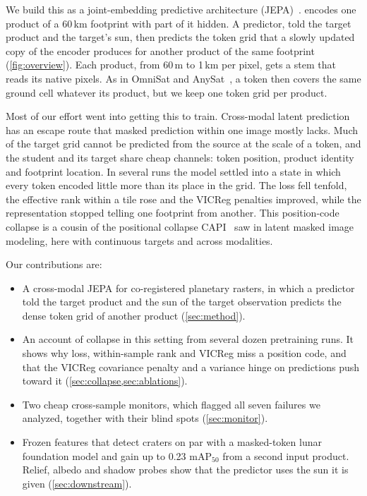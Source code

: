 We build this as a joint-embedding predictive architecture (JEPA)~\cite{assran2023self,bardes2024revisiting}. \method encodes one product of a 60\,km footprint with part of it hidden. A predictor, told the target product and the target's sun, then predicts the token grid that a slowly updated copy of the encoder produces for another product of the same footprint (\cref{fig:overview}). Each product, from 60\,m to 1\,km per pixel, gets a stem that reads its native pixels. As in OmniSat and AnySat~\cite{astruc2024omnisat,astruc2025anysat}, a token then covers the same ground cell whatever its product, but we keep one token grid per product.

Most of our effort went into getting this to train. Cross-modal latent prediction has an escape route that masked prediction within one image mostly lacks. Much of the target grid cannot be predicted from the source at the scale of a token, and the student and its target share cheap channels: token position, product identity and footprint location. In several runs the model settled into a state in which every token encoded little more than its place in the grid. The loss fell tenfold, the effective rank within a tile rose and the VICReg penalties improved, while the representation stopped telling one footprint from another. This position-code collapse is a cousin of the positional collapse CAPI~\cite{darcet2025cluster} saw in latent masked image modeling, here with continuous targets and across modalities.

Our contributions are:
\begin{itemize}[leftmargin=*,itemsep=1pt,topsep=2pt]
  \item A cross-modal JEPA for co-registered planetary rasters, in which a predictor told the target product and the sun of the target observation predicts the dense token grid of another product (\cref{sec:method}).
  \item An account of collapse in this setting from several dozen pretraining runs. It shows why loss, within-sample rank and VICReg miss a position code, and that the VICReg covariance penalty and a variance hinge on predictions push toward it (\cref{sec:collapse,sec:ablations}).
  \item Two cheap cross-sample monitors, which flagged all seven failures we analyzed, together with their blind spots (\cref{sec:monitor}).
  \item Frozen features that detect craters on par with a masked-token lunar foundation model and gain up to 0.23 mAP$_{50}$ from a second input product. Relief, albedo and shadow probes show that the predictor uses the sun it is given (\cref{sec:downstream}).
\end{itemize}
